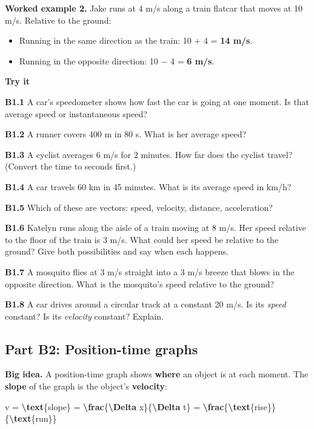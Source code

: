 \documentclass[
]{article}
\newenvironment{Shaded}{\begin{snugshade}}{\end{snugshade}}
\newcommand{\FunctionTok}[1]{\textcolor[rgb]{0.13,0.29,0.53}{\textbf{#1}}}
\newcommand{\NormalTok}[1]{#1}
\providecommand{\tightlist}{%
  \setlength{\itemsep}{0pt}\setlength{\parskip}{0pt}}
\begin{document}
\textbf{Worked example 2.} Jake runs at 4 m/s along a train flatcar that
moves at 10 m/s. Relative to the ground:

\begin{itemize}
\tightlist
\item
  Running in the same direction as the train: 10 + 4 = \textbf{14 m/s}.
\item
  Running in the opposite direction: 10 − 4 = \textbf{6 m/s}.
\end{itemize}

\textbf{Try it}

\textbf{B1.1} A car's speedometer shows how fast the car is going at one
moment. Is that average speed or instantaneous speed?

\textbf{B1.2} A runner covers 400 m in 80 s. What is her average speed?

\textbf{B1.3} A cyclist averages 6 m/s for 2 minutes. How far does the
cyclist travel? (Convert the time to seconds first.)

\textbf{B1.4} A car travels 60 km in 45 minutes. What is its average
speed in km/h?

\textbf{B1.5} Which of these are vectors: speed, velocity, distance,
acceleration?

\textbf{B1.6} Katelyn runs along the aisle of a train moving at 8 m/s.
Her speed relative to the floor of the train is 3 m/s. What could her
speed be relative to the ground? Give both possibilities and say when
each happens.

\textbf{B1.7} A mosquito flies at 3 m/s straight into a 3 m/s breeze
that blows in the opposite direction. What is the mosquito's speed
relative to the ground?

\textbf{B1.8} A car drives around a circular track at a constant 20 m/s.
Is its \emph{speed} constant? Is its \emph{velocity} constant? Explain.

\subsection{Part B2: Position-time
graphs}\label{part-b2-position-time-graphs}

\textbf{Big idea.} A position-time graph shows \textbf{where} an object
is at each moment. The \textbf{slope} of the graph is the object's
\textbf{velocity}:

\begin{Shaded}
\begin{Highlighting}[]
\NormalTok{v = }\FunctionTok{\textbackslash{}text}\NormalTok{\{slope\} = }\FunctionTok{\textbackslash{}frac}\NormalTok{\{}\FunctionTok{\textbackslash{}Delta}\NormalTok{ x\}\{}\FunctionTok{\textbackslash{}Delta}\NormalTok{ t\} = }\FunctionTok{\textbackslash{}frac}\NormalTok{\{}\FunctionTok{\textbackslash{}text}\NormalTok{\{rise\}\}\{}\FunctionTok{\textbackslash{}text}\NormalTok{\{run\}\}}
\end{Highlighting}
\end{Shaded}
\end{document}
